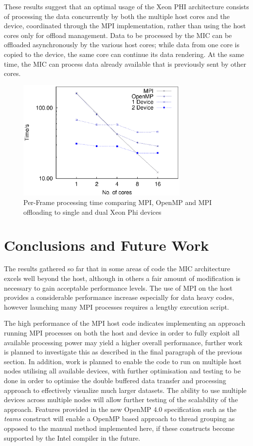 \documentclass[runningheads,a4paper]{llncs}
\begin{document}
These results suggest that an optimal usage of the Xeon PHI architecture consists of processing the data concurrently by both 
the multiple host cores and the device, coordinated through the MPI implementation, rather than using the host cores only for offload 
management.
Data to be processed by the MIC can be offloaded asynchronously by the various host cores; while data from one core is copied to 
the device, the same core can continue its data rendering. At the same time, the MIC can process data already available that is 
previously sent by other cores.

\begin{figure}
\centering
\includegraphics[height=6.0cm]{mpi_omp_mic}
\caption{Per-Frame processing time comparing MPI, OpenMP and MPI offloading to single and dual Xeon Phi devices}
\label{fig:mpitimes}
\end{figure}



\section{Conclusions and Future Work}
\label{sect:conclusions}

The results gathered so far that in some areas of code the MIC architecture excels well beyond the host, 
although in others a fair amount of modification is necessary to gain acceptable performance levels. The use of MPI on the host
provides a considerable performance increase especially for data heavy codes, however launching many MPI processes requires a lengthy 
execution script.

The high performance of the MPI host code indicates implementing an approach running MPI processes on both the host and device 
in order to fully exploit all available processing power may yield a higher overall performance, further work is planned to investigate this 
as described in the final paragraph of the previous section.
In addition, work is planned to enable the code to run on multiple host nodes utilising all available devices, with further optimisation and 
testing to be done in order to optimise the double buffered data transfer and processing approach to effectively visualize much larger 
datasets. The ability to use multiple devices across multiple nodes will allow further testing of the scalability of the approach. 
Features provided in the new OpenMP 4.0 specification such as the \textit{teams} construct will enable a OpenMP based approach to 
thread grouping as opposed to the manual method implemented here, if these constructs become supported by the Intel compiler in the future. 
\end{document}
